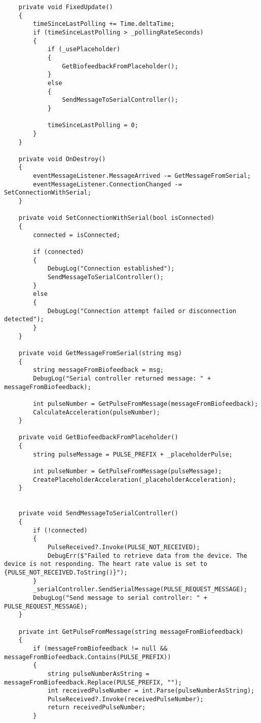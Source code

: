 \begin{verbatim}
    private void FixedUpdate()
    {
        timeSinceLastPolling += Time.deltaTime;
        if (timeSinceLastPolling > _pollingRateSeconds)
        {
            if (_usePlaceholder)
            {
                GetBiofeedbackFromPlaceholder();
            }
            else
            {
                SendMessageToSerialController();
            }

            timeSinceLastPolling = 0;
        }
    }

    private void OnDestroy()
    {
        eventMessageListener.MessageArrived -= GetMessageFromSerial;
        eventMessageListener.ConnectionChanged -= SetConnectionWithSerial;
    }

    private void SetConnectionWithSerial(bool isConnected)
    {
        connected = isConnected;

        if (connected)
        {
            DebugLog("Connection established");
            SendMessageToSerialController();
        }
        else
        {
            DebugLog("Connection attempt failed or disconnection detected");
        }
    }

    private void GetMessageFromSerial(string msg)
    {
        string messageFromBiofeedback = msg;
        DebugLog("Serial controller returned message: " + messageFromBiofeedback);

        int pulseNumber = GetPulseFromMessage(messageFromBiofeedback);
        CalculateAcceleration(pulseNumber);
    }

    private void GetBiofeedbackFromPlaceholder()
    {
        string pulseMessage = PULSE_PREFIX + _placeholderPulse;

        int pulseNumber = GetPulseFromMessage(pulseMessage);
        CreatePlaceholderAcceleration(_placeholderAcceleration);
    }


    private void SendMessageToSerialController()
    {
        if (!connected)
        {
            PulseReceived?.Invoke(PULSE_NOT_RECEIVED);
            DebugErr($"Failed to retrieve data from the device. The device is not responding. The heart rate value is set to {PULSE_NOT_RECEIVED.ToString()}");
        }
        _serialController.SendSerialMessage(PULSE_REQUEST_MESSAGE);
        DebugLog("Send message to serial controller: " + PULSE_REQUEST_MESSAGE);
    }

    private int GetPulseFromMessage(string messageFromBiofeedback)
    {
        if (messageFromBiofeedback != null && messageFromBiofeedback.Contains(PULSE_PREFIX))
        {
            string pulseNumberAsString = messageFromBiofeedback.Replace(PULSE_PREFIX, "");
            int receivedPulseNumber = int.Parse(pulseNumberAsString);
            PulseReceived?.Invoke(receivedPulseNumber);
            return receivedPulseNumber;
        }


\end{verbatim}
